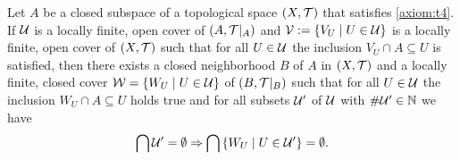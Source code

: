 \begin{lemma}
	Let $A$ be a closed subspace of a topological space $\tspace$ that satisfies \ref{axiom:t4}. If $\cover$ is a locally finite, open cover of $\reltspace$ and $\cover[V] := \Bbraces{V_U \mid U \in \cover}$ is a locally finite, open cover of $\tspace$ such that for all $U \in \cover$ the inclusion $V_U \cap A \subseteq U$ is satisfied, then there exists a closed neighborhood $B$ of $A$ in $\tspace$ and a locally finite, closed cover $\cover[W] = \Bbraces{W_U \mid U \in \cover}$ of $\reltspace[B]$ such that for all $U \in \cover$ the inclusion $W_U \cap A \subseteq U$ holds true and for all subsets $\cover^\prime$ of $\cover$ with $\card{\cover^\prime} \in \N$ we have
	\begin{align*}
	\bigcap \cover^\prime = \emptyset \Rightarrow \bigcap \Bbraces{W_U \mid U \in \cover^\prime} = \emptyset. 
	\end{align*}
\end{lemma}
